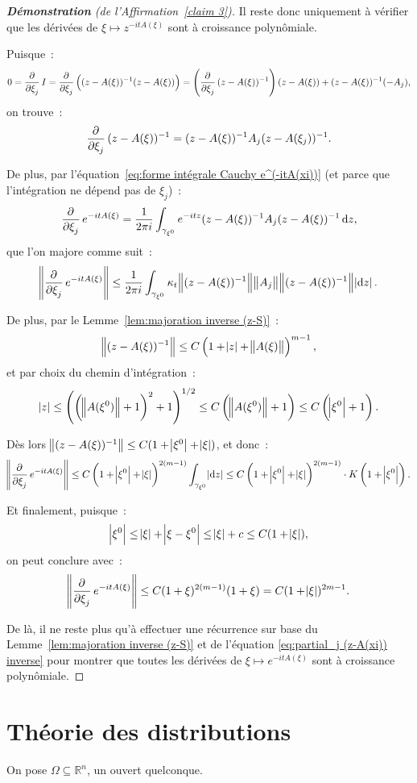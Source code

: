 \documentclass{report}
\newcommand{\R}{{\mathbb R}}
\theoremstyle{definition}
\theoremstyle{remark}
\begin{document}
\begin{proof}[\textnormal {\textbf {Démonstration} (de l'Affirmation~\ref{claim 3})}] Il reste donc uniquement à vérifier que les dérivées de $\xi \mapsto z^{-itA(\xi)}$ sont à
croissance polynômiale.

Puisque~:
\[0 = \dpd {}{\xi_j}I = \dpd {}{\xi_j}\left((z-A(\xi))^{-1}(z-A(\xi))\right) = \left(\dpd {}{\xi_j}(z-A(\xi))^{-1}\right)(z-A(\xi)) + (z-A(\xi))^{-1}(-A_j),\]
on trouve~:
\begin{equation}\label{eq:partial_j (z-A(xi)) inverse}
	\dpd {}{\xi_j}(z-A(\xi))^{-1} = (z-A(\xi))^{-1}A_j(z-A(\xi_j))^{-1}.
\end{equation}

De plus, par l'équation~\eqref{eq:forme intégrale Cauchy e^(-itA(xi))} (et parce que l'intégration ne dépend pas de $\xi_j$)~:
\[\dpd {}{\xi_j}e^{-itA(\xi)} = \frac 1{2\pi i}\int_{\gamma_{\xi^0}}e^{-itz}(z-A(\xi))^{-1}A_j(z-A(\xi))^{-1}\dif z,\]
que l'on majore comme suit~:
\[\norm {\dpd {}{\xi_j}e^{-itA(\xi)}} \leq \frac 1{2\pi i}\int_{\gamma_{\xi^0}}\kappa_t\norm {(z-A(\xi))^{-1}}\norm {A_j}\norm {(z-A(\xi))^{-1}}\abs {\dif z}.\]

De plus, par le Lemme~\ref{lem:majoration inverse (z-S)}~:
\[\norm {(z-A(\xi))^{-1}} \leq C\left(1+\abs z + \norm {A(\xi)}\right)^{m-1},\]
et par choix du chemin d'intégration~:
\[\abs z \leq \left(\left(\norm {A(\xi^0)} + 1\right)^2 + 1\right)^{1/2} \leq C\left(\norm {A(\xi^0)}+1\right) \leq C\left(\abs {\xi^0}+1\right).\]

Dès lors $\norm {(z-A(\xi))^{-1}} \leq C(1+\abs {\xi^0}+\abs {\xi})$, et donc~:
\[\norm {\dpd {}{\xi_j}e^{-itA(\xi)}} \leq C\left(1+\abs {\xi^0}+\abs \xi\right)^{2(m-1)}\int_{\gamma_{\xi^0}}\abs {\dif z}
	\leq C\left(1 + \abs {\xi^0} + \abs \xi\right)^{2(m-1)} \cdot K \left(1+\abs {\xi^0}\right).\]

Et finalement, puisque~:
\[\abs {\xi^0} \leq \abs \xi + \abs {\xi-\xi^0} \leq \abs \xi + c \leq C(1+\abs \xi),\]
on peut conclure avec~:
\[\norm {\dpd {}{\xi_j}e^{-itA(\xi)}} \leq C(1+\xi)^{2(m-1)}(1+\xi) = C(1+\abs \xi)^{2m-1}.\]

De là, il ne reste plus qu'à effectuer une récurrence sur base du Lemme~\ref{lem:majoration inverse (z-S)} et de l'équation \eqref{eq:partial_j (z-A(xi)) inverse} pour montrer
que toutes les dérivées de $\xi \mapsto e^{-itA(\xi)}$ sont à croissance polynômiale.
\end{proof}

\chapter{Théorie des distributions}
On pose $\Omega \subseteq \R^n$, un ouvert quelconque.
\end{document}
